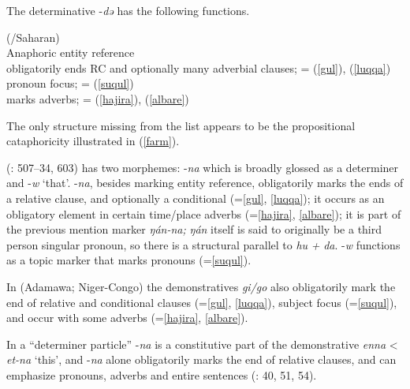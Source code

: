 \documentclass[output=paper]{langsci/langscibook}
\begin{document}
The  determinative -\textit{də} has the following functions.


\ea\label{kanuri}
{}{}{ (/Saharan)}\\

{}{}{Anaphoric entity reference}\\
  \ea
{}{}{obligatorily ends RC and optionally many adverbial clauses}; = (\ref{gul}), (\ref{luqqa})\\
\ex
{}{}{pronoun focus}; = (\ref{suqul})\\
\ex
{}{}{marks adverbs}; = (\ref{hajira}), (\ref{albare})\\
\z
\z

The only  structure missing from the list appears to be the propositional cataphoricity illustrated in (\ref{farm}).

 (\citealt{Frajzyngier2012}: 507–34, 603) has two morphemes: -\textit{na} which is broadly glossed as a determiner and -\textit{w} ‘that’. -\textit{na}, besides marking entity reference, obligatorily marks the ends of a {relative} clause, and optionally a {conditional} (=\ref{gul}, \ref{luqqa}); it occurs as an obligatory element in certain time/place adverbs (=\ref{hajira}, \ref{albare}); it is part of the previous mention marker \textit{ŋán-na;} \textit{ŋán} itself is said to originally be a third person singular pronoun, so there is a structural parallel to \textit{hu} \textit{+} \textit{da}. -\textit{w} functions as a topic marker that marks pronouns (=\ref{suqul}).

In  (Adamawa; Niger-Congo) the {demonstratives} \textit{gi/go} also obligatorily mark the end of {relative} and {conditional} clauses (=\ref{gul}, \ref{luqqa}), subject focus (=\ref{suqul}), and occur with some adverbs (=\ref{hajira}, \ref{albare}).

In  a “determiner particle” -\textit{na} is a constitutive part of the demonstrative \textit{enna} < \textit{et-na} ‘this’, and -\textit{na} alone obligatorily marks the end of {relative} clauses, and can emphasize pronouns, adverbs and entire sentences (\citealt{Stevenson1969}: 40, 51, 54).
\end{document}
